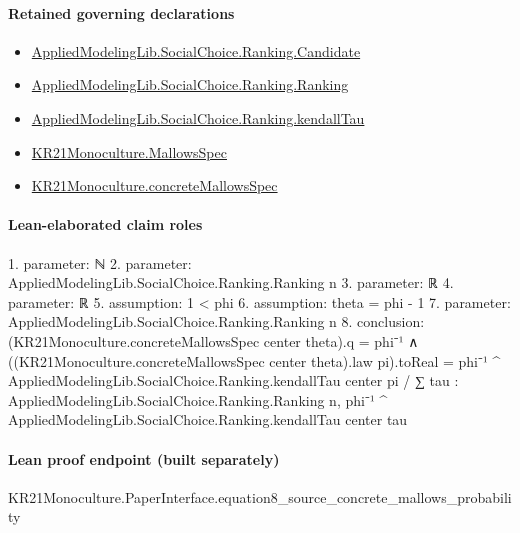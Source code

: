 \documentclass[10pt]{article}
\begin{document}
\paragraph{Retained governing declarations}
\begin{itemize}\raggedright
\item \hyperlink{library-prerequisite-8c0e6c25845ae78a}{Applied\allowbreak{}Modeling\allowbreak{}Lib.\allowbreak{}Social\allowbreak{}Choice.\allowbreak{}Ranking.\allowbreak{}Candidate}
\item \hyperlink{library-prerequisite-5cde54446d1ae021}{Applied\allowbreak{}Modeling\allowbreak{}Lib.\allowbreak{}Social\allowbreak{}Choice.\allowbreak{}Ranking.\allowbreak{}Ranking}
\item \hyperlink{governing-declaration-127efd44d176e2ba}{Applied\allowbreak{}Modeling\allowbreak{}Lib.\allowbreak{}Social\allowbreak{}Choice.\allowbreak{}Ranking.\allowbreak{}kendall\allowbreak{}Tau}
\item \hyperlink{governing-declaration-b2e6ec0602659b07}{KR21\allowbreak{}Monoculture.\allowbreak{}Mallows\allowbreak{}Spec}
\item \hyperlink{governing-declaration-0e399c7dd166853c}{KR21\allowbreak{}Monoculture.\allowbreak{}concrete\allowbreak{}Mallows\allowbreak{}Spec}
\end{itemize}
\paragraph{Lean-elaborated claim roles}\begin{ReviewVerbatim}
1. parameter: ℕ
2. parameter: AppliedModelingLib.SocialChoice.Ranking.Ranking n
3. parameter: ℝ
4. parameter: ℝ
5. assumption: 1 < phi
6. assumption: theta = phi - 1
7. parameter: AppliedModelingLib.SocialChoice.Ranking.Ranking n
8. conclusion: (KR21Monoculture.concreteMallowsSpec center theta).q = phi⁻¹ ∧
  ((KR21Monoculture.concreteMallowsSpec center theta).law pi).toReal =
    phi⁻¹ ^ AppliedModelingLib.SocialChoice.Ranking.kendallTau center pi /
      ∑ tau : AppliedModelingLib.SocialChoice.Ranking.Ranking n,
        phi⁻¹ ^ AppliedModelingLib.SocialChoice.Ranking.kendallTau center tau
\end{ReviewVerbatim}

\paragraph{Lean proof endpoint (built separately)}\begin{ReviewVerbatim}
KR21Monoculture.PaperInterface.equation8_source_concrete_mallows_probability
\end{ReviewVerbatim}
\end{document}
